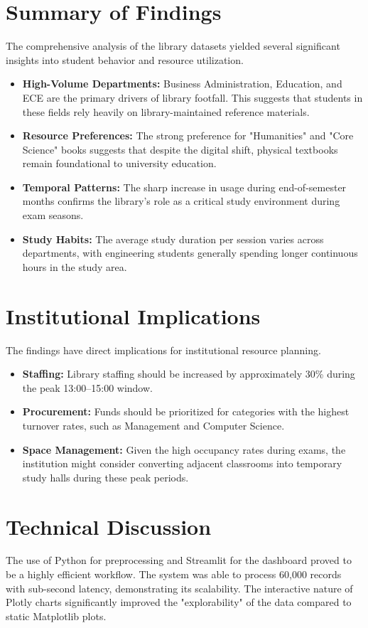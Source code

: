 \documentclass[12pt,a4paper]{report}
\begin{document}
\section{Summary of Findings}
The comprehensive analysis of the library datasets yielded several significant insights into student behavior and resource utilization.
\begin{itemize}
    \item \textbf{High-Volume Departments:} Business Administration, Education, and ECE are the primary drivers of library footfall. This suggests that students in these fields rely heavily on library-maintained reference materials.
    \item \textbf{Resource Preferences:} The strong preference for "Humanities" and "Core Science" books suggests that despite the digital shift, physical textbooks remain foundational to university education.
    \item \textbf{Temporal Patterns:} The sharp increase in usage during end-of-semester months confirms the library's role as a critical study environment during exam seasons.
    \item \textbf{Study Habits:} The average study duration per session varies across departments, with engineering students generally spending longer continuous hours in the study area.
\end{itemize}

\section{Institutional Implications}
The findings have direct implications for institutional resource planning.
\begin{itemize}
    \item \textbf{Staffing:} Library staffing should be increased by approximately 30\% during the peak 13:00--15:00 window.
    \item \textbf{Procurement:} Funds should be prioritized for categories with the highest turnover rates, such as Management and Computer Science.
    \item \textbf{Space Management:} Given the high occupancy rates during exams, the institution might consider converting adjacent classrooms into temporary study halls during these peak periods.
\end{itemize}

\section{Technical Discussion}
The use of Python for preprocessing and Streamlit for the dashboard proved to be a highly efficient workflow. The system was able to process 60,000 records with sub-second latency, demonstrating its scalability. The interactive nature of Plotly charts significantly improved the "explorability" of the data compared to static Matplotlib plots.
\end{document}
